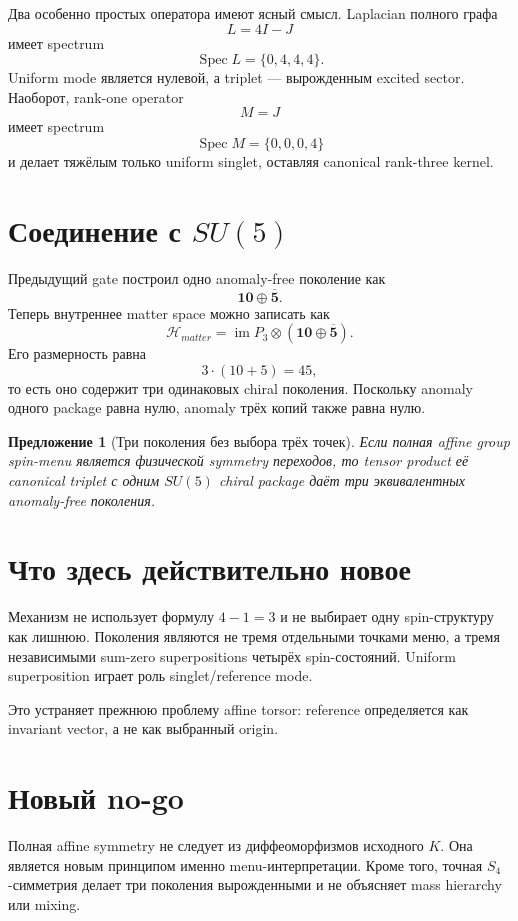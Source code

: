 \documentclass[12pt,a4paper]{article}
\newtheorem{proposition}{Предложение}
\begin{document}
Два особенно простых оператора имеют ясный смысл. Laplacian полного графа
\[
L=4I-J
\]
имеет spectrum
\[
\operatorname{Spec}L=\{0,4,4,4\}.
\]
Uniform mode является нулевой, а triplet --- вырожденным excited sector. Наоборот, rank-one operator
\[
M=J
\]
имеет spectrum
\[
\operatorname{Spec}M=\{0,0,0,4\}
\]
и делает тяжёлым только uniform singlet, оставляя canonical rank-three kernel.

\section{Соединение с \(SU(5)\)}

Предыдущий gate построил одно anomaly-free поколение как
\[
\mathbf{10}\oplus\overline{\mathbf5}.
\]
Теперь внутреннее matter space можно записать как
\[
\mathcal H_{matter}
=\operatorname{im}P_3
\otimes
\left(\mathbf{10}\oplus\overline{\mathbf5}\right).
\]
Его размерность равна
\[
3\cdot(10+5)=45,
\]
то есть оно содержит три одинаковых chiral поколения. Поскольку anomaly одного package равна нулю, anomaly трёх копий также равна нулю.

\begin{proposition}[Три поколения без выбора трёх точек]
Если полная affine group spin-menu является физической symmetry переходов, то tensor product её canonical triplet с одним \(SU(5)\) chiral package даёт три эквивалентных anomaly-free поколения.
\end{proposition}

\section{Что здесь действительно новое}

Механизм не использует формулу \(4-1=3\) и не выбирает одну spin-структуру как лишнюю. Поколения являются не тремя отдельными точками меню, а тремя независимыми sum-zero superpositions четырёх spin-состояний. Uniform superposition играет роль singlet/reference mode.

Это устраняет прежнюю проблему affine torsor: reference определяется как invariant vector, а не как выбранный origin.

\section{Новый no-go}

Полная affine symmetry не следует из диффеоморфизмов исходного \(K\). Она является новым принципом именно menu-интерпретации. Кроме того, точная \(S_4\)-симметрия делает три поколения вырожденными и не объясняет mass hierarchy или mixing.
\end{document}
